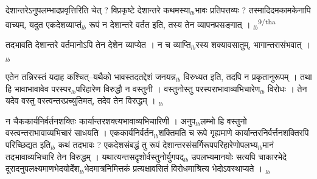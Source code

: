 \documentclass[article,12pt,a4paper]{memoir}%
\newcounter{parCount}
\begin{document}
	  \pstart \leavevmode%
	देशान्तरेऽनुपलम्भादप्रवृत्तिरिति चेत् ? विप्रकृष्टे देशान्तरे कथमस्या{\tiny $_{lb}$}भावः प्रतिपत्तव्यः ? तस्मादिदमकामकेनापि वाच्यम्, यदुत एकदेशव्याप्तं{\tiny $_{lb}$} रूपं न देशान्तरे वर्तत इति, तस्य तेन व्यापनप्रसङ्गात् ।
	{}
	\pend%
      {\tiny $_{lb}$}\textsuperscript{\textenglish{9/tha}}

	  \pstart \leavevmode%
	तदभावति देशान्तरे वर्तमानोऽपि तेन देशेन व्याप्येत । न च व्याप्ति{\tiny $_{lb}$}रस्य शक्यावसातुम्, भागान्तरासंभवात् ।
	{}
	\pend%
      {\tiny $_{lb}$}

	  \pstart \leavevmode%
	एतेन तन्निरस्तं यदाह कश्चित्--यथैको भावस्तदतद्देशं जनयन्न{\tiny $_{lb}$} विरुध्यत इति, तदपि न प्रकृतानुरूपम् । तथा हि भावाभावावेव परस्पर{\tiny $_{lb}$}परिहारेण विरुद्धौ न वस्तुनी । वस्तुनोस्तु परस्पराभावाव्यभिचारेण{\tiny $_{lb}$} विरोधः । तेन यदेव वस्तु वस्त्वन्तरप्रच्युतिमत्, तदेव तेन विरुद्धम् ।
	{}
	\pend%
      {\tiny $_{lb}$}

	  \pstart \leavevmode%
	न चैककार्यनिर्वर्तनशक्तिः कार्यान्तरशक्त्यभावाव्यभिचारिणी । अनुप{\tiny $_{lb}$}लम्भो हि वस्तुनो वस्त्वन्तराभावाव्यभिचारं साधयति । एककार्यनिर्वर्तन{\tiny $_{lb}$}शक्तिमति च रूपे गृह्यमाणे कार्यान्तरनिर्वर्त्तनशक्तिरपि परिच्छिद्यत इति{\tiny $_{lb}$} कथं तदभावः ? एकदेशसंबद्धं तु रूपं देशान्तरसंसर्गिरूपपरिहारेणोपलभ्य{\tiny $_{lb}$}मानं तदभावाव्यभिचारि तेन विरुद्धम् । यथात्यन्तसदृशोर्वस्तुनोर्युगपद्{\tiny $_{lb}$} \leavevmode{} उपलभ्यमानयोः सत्यपि चाकारभेदे दूरादनुपलक्ष्यमाणभेदयोर्देश{\tiny $_{lb}$}भेदमात्रनिमित्तकं प्रत्यक्षावसितं विरोधमाश्रित्य भेदोऽवस्थाप्यते ।
	{}
	\pend%
      {\tiny $_{lb}$}
\end{document}
